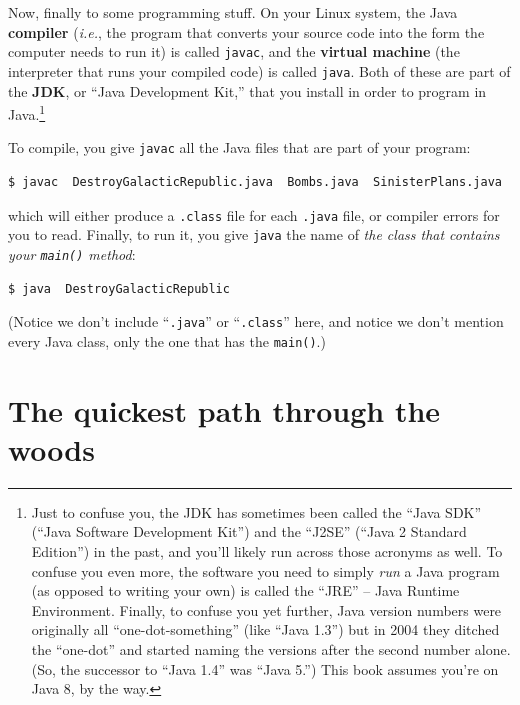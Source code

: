 \begin{enumerate}
Now, finally to some programming stuff. On your Linux system, the Java
\textbf{compiler} (\textit{i.e.}, the program that converts your source code
into the form the computer needs to run it) is called \texttt{javac}, and the
\textbf{virtual machine} (the interpreter that runs your compiled code) is
called \texttt{java}. Both of these are part of the \textbf{JDK}, or ``Java
Development Kit,'' that you install in order to program in Java.\footnote{Just
to confuse you, the JDK has sometimes been called the ``Java SDK'' (``Java
Software Development Kit'') and the ``J2SE'' (``Java 2 Standard Edition'') in
the past, and you'll likely run across those acronyms as well. To confuse you
even more, the software you need to simply \textit{run} a Java program (as
opposed to writing your own) is called the ``JRE'' -- Java Runtime
Environment. Finally, to confuse you yet further, Java version numbers were
originally all ``one-dot-something'' (like ``Java 1.3'') but in 2004 they
ditched the ``one-dot'' and started naming the versions after the second
number alone. (So, the successor to ``Java 1.4'' was ``Java 5.'') This book
assumes you're on Java 8, by the way.}


To compile, you give \texttt{javac} all the Java files that are part of your
program:

\begin{Verbatim}[fontsize=\scriptsize]
$ javac  DestroyGalacticRepublic.java  Bombs.java  SinisterPlans.java
\end{Verbatim}

which will either produce a \texttt{.class} file for each \texttt{.java} file,
or compiler errors for you to read. Finally, to run it, you give \texttt{java}
the name of \textit{the class that contains your \texttt{main()} method}:

\begin{Verbatim}[fontsize=\footnotesize]
$ java  DestroyGalacticRepublic
\end{Verbatim}

(Notice we don't include ``\texttt{.java}'' or ``\texttt{.class}'' here, and
notice we don't mention every Java class, only the one that has the
\texttt{main()}.)

\end{enumerate}

\pagebreak
\section{The quickest path through the woods}

